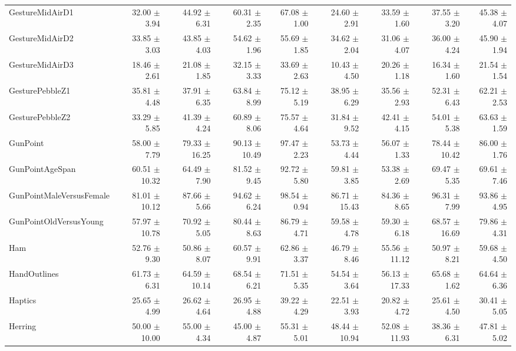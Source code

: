 \begin{landscape}
\begin{longtable}{lrrrrrrrr}
GestureMidAirD1 & 32.00 $\pm$ 3.94 & 44.92 $\pm$ 6.31 & 60.31 $\pm$ 2.35 & 67.08 $\pm$ 1.00 & 24.60 $\pm$ 2.91 & 33.59 $\pm$ 1.60 & 37.55 $\pm$ 3.20 & 45.38 $\pm$ 4.07 \\
GestureMidAirD2 & 33.85 $\pm$ 3.03 & 43.85 $\pm$ 4.03 & 54.62 $\pm$ 1.96 & 55.69 $\pm$ 1.85 & 34.62 $\pm$ 2.04 & 31.06 $\pm$ 4.07 & 36.00 $\pm$ 4.24 & 45.90 $\pm$ 1.94 \\
GestureMidAirD3 & 18.46 $\pm$ 2.61 & 21.08 $\pm$ 1.85 & 32.15 $\pm$ 3.33 & 33.69 $\pm$ 2.63 & 10.43 $\pm$ 4.50 & 20.26 $\pm$ 1.18 & 16.34 $\pm$ 1.60 & 21.54 $\pm$ 1.54 \\
GesturePebbleZ1 & 35.81 $\pm$ 4.48 & 37.91 $\pm$ 6.35 & 63.84 $\pm$ 8.99 & 75.12 $\pm$ 5.19 & 38.95 $\pm$ 6.29 & 35.56 $\pm$ 2.93 & 52.31 $\pm$ 6.43 & 62.21 $\pm$ 2.53 \\
GesturePebbleZ2 & 33.29 $\pm$ 5.85 & 41.39 $\pm$ 4.24 & 60.89 $\pm$ 8.06 & 75.57 $\pm$ 4.64 & 31.84 $\pm$ 9.52 & 42.41 $\pm$ 4.15 & 54.01 $\pm$ 5.38 & 63.63 $\pm$ 1.59 \\
GunPoint & 58.00 $\pm$ 7.79 & 79.33 $\pm$ 16.25 & 90.13 $\pm$ 10.49 & 97.47 $\pm$ 2.23 & 53.73 $\pm$ 4.44 & 56.07 $\pm$ 1.33 & 78.44 $\pm$ 10.42 & 86.00 $\pm$ 1.76 \\
GunPointAgeSpan & 60.51 $\pm$ 10.32 & 64.49 $\pm$ 7.90 & 81.52 $\pm$ 9.45 & 92.72 $\pm$ 5.80 & 59.81 $\pm$ 3.85 & 53.38 $\pm$ 2.69 & 69.47 $\pm$ 5.35 & 69.61 $\pm$ 7.46 \\
GunPointMaleVersusFemale & 81.01 $\pm$ 10.12 & 87.66 $\pm$ 5.66 & 94.62 $\pm$ 6.24 & 98.54 $\pm$ 0.94 & 86.71 $\pm$ 15.43 & 84.36 $\pm$ 8.65 & 96.31 $\pm$ 7.99 & 93.86 $\pm$ 4.95 \\
GunPointOldVersusYoung & 57.97 $\pm$ 10.78 & 70.92 $\pm$ 5.05 & 80.44 $\pm$ 8.63 & 86.79 $\pm$ 4.71 & 59.58 $\pm$ 4.78 & 59.30 $\pm$ 6.18 & 68.57 $\pm$ 16.69 & 79.86 $\pm$ 4.31 \\
Ham & 52.76 $\pm$ 9.30 & 50.86 $\pm$ 8.07 & 60.57 $\pm$ 9.91 & 62.86 $\pm$ 3.37 & 46.79 $\pm$ 8.46 & 55.56 $\pm$ 11.12 & 50.97 $\pm$ 8.21 & 59.68 $\pm$ 4.50 \\
HandOutlines & 61.73 $\pm$ 6.31 & 64.59 $\pm$ 10.14 & 68.54 $\pm$ 6.21 & 71.51 $\pm$ 5.35 & 54.54 $\pm$ 3.64 & 56.13 $\pm$ 17.33 & 65.68 $\pm$ 1.62 & 64.64 $\pm$ 6.36 \\
Haptics & 25.65 $\pm$ 4.99 & 26.62 $\pm$ 4.64 & 26.95 $\pm$ 4.88 & 39.22 $\pm$ 4.29 & 22.51 $\pm$ 3.93 & 20.82 $\pm$ 4.72 & 25.61 $\pm$ 4.50 & 30.41 $\pm$ 5.05 \\
Herring & 50.00 $\pm$ 10.00 & 55.00 $\pm$ 4.34 & 45.00 $\pm$ 4.87 & 55.31 $\pm$ 5.01 & 48.44 $\pm$ 10.94 & 52.08 $\pm$ 11.93 & 38.36 $\pm$ 6.31 & 47.81 $\pm$ 5.02 \\

\end{longtable}
\end{landscape}

